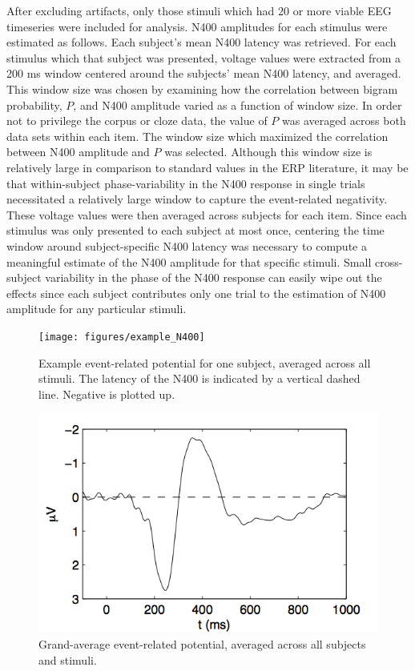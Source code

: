 \documentclass{article}
\begin{document}
After excluding artifacts, only those stimuli which had 20 or more viable EEG timeseries were included for analysis. N400 amplitudes for each stimulus were estimated as follows. Each subject's mean N400 latency was retrieved. For each stimulus which that subject was presented, voltage values were extracted from a 200 ms window centered around the subjects' mean N400 latency, and averaged. This window size was chosen by examining how the correlation between bigram probability, $P$, and N400 amplitude varied as a function of window size. In order not to privilege the corpus or cloze data, the value of $P$ was averaged across both data sets within each item. The window size which maximized the correlation between N400 amplitude and $P$ was selected. Although this window size is relatively large in comparison to standard values in the ERP literature, it may be that within-subject phase-variability in the N400 response in single trials necessitated a relatively large window to capture the event-related negativity. These voltage values were then averaged across subjects for each item. Since each stimulus was only presented to each subject at most once, centering the time window around subject-specific N400 latency was necessary to compute a meaningful estimate of the N400 amplitude for that specific stimuli. Small cross-subject variability in the phase of the N400 response can easily wipe out the effects since each subject contributes only one trial to the estimation of N400 amplitude for any particular stimuli.


\begin{figure}
	\centering
		\texttt{[image: figures/example\_N400]}
	\caption{Example event-related potential for one subject, averaged across all stimuli. The latency of the N400 is indicated by a vertical dashed line. Negative is plotted up.
    \label{fig:egERP}}
\end{figure}

\begin{figure}
	\centering
		\includegraphics{figures/grand_N400}
	\caption{Grand-average event-related potential, averaged across all subjects and stimuli. 
    \label{fig:grandERP}}
\end{figure}
\end{document}
